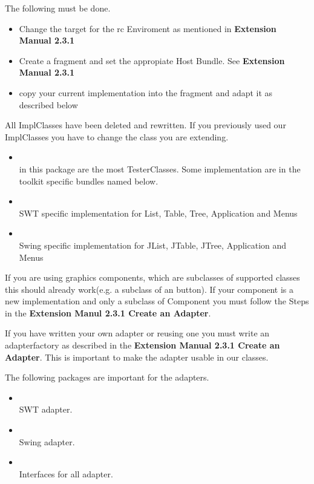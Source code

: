 The following must be done.
\begin{itemize}
\item Change the target for the rc Enviroment as mentioned in \textbf{Extension Manual 2.3.1}
\item Create a fragment and set the appropiate Host Bundle. See \textbf{Extension Manual 2.3.1}
\item copy your current implementation into the fragment and adapt it as described below
\end{itemize}
All ImplClasses have been deleted and rewritten. If you previously used our ImplClasses you
have to change the class you are extending.
\begin{itemize}
\item {}\\ in this package are the
  most TesterClasses. Some implementation are in the toolkit specific
  bundles named below.
\item {}\\ SWT specific implementation
 for List, Table, Tree, Application and Menus
\item {}\\ Swing specific
  implementation for JList, JTable, JTree, Application and Menus
\end{itemize}

If you are using graphics components, which are subclasses of supported classes
this should already work(e.g. a subclass of an button). If your
component is a new implementation and only a subclass of Component you must follow the Steps in the \textbf{Extension Manul 2.3.1 Create an Adapter}.

If you have written your own adapter or reusing one you must write an
adapterfactory as described in the \textbf{Extension Manual 2.3.1 Create an Adapter}. This is important to make
the adapter usable in our classes.

The following packages are important for the adapters.
\begin{itemize}
\item {}\\ SWT adapter.
\item {}\\ Swing adapter.
\item {}\\Interfaces for all adapter.
\end{itemize}
